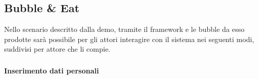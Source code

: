 \subsection{Bubble \& Eat}
Nello scenario descritto dalla demo, tramite il framework e le bubble da esso prodotte sarà possibile per gli attori interagire con il sistema nei seguenti modi, suddivisi per attore che li compie.

\subsubsection{\Customer{}}
\begin{samepage}
\paragraph{Inserimento dati personali}\mbox{}\\
\end{samepage}

